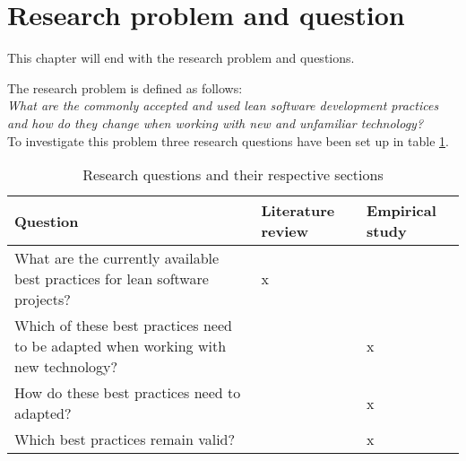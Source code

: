 \section{Research problem and question}
\label{section:problem}

This chapter will end with the research problem and questions.

The research problem is defined as follows:\\

\textit{What are the commonly accepted and used lean software development practices and how do they change when working with new and unfamiliar technology?}\\

To investigate this problem three research questions have been set up in table \ref{tbl:questions}.


\begin{table}
  \begin{tabular}{p{200pt} | p{70pt} | p{70pt}}
    Question & Literature review & Empirical study \\
    \hline
    What are the currently available best practices for lean software projects? & x & \\
    Which of these best practices need to be adapted when working with new technology? &  & x \\
    How do these best practices need to adapted? &  & x \\
    Which best practices remain valid? &  & x \\
  \end{tabular}
  \caption{Research questions and their respective sections}
  \label{tbl:questions}
\end{table}